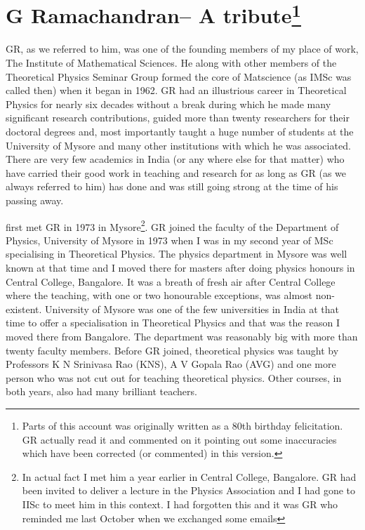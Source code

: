 
\renewcommand{\thefootnote}{\arabic{footnote}}

\chapter[G Ramachandran– A tribute]{G Ramachandran– A tribute\footnote{Parts of this account was originally written as a 80th birthday felicitation. GR actually read it and commented on it pointing out some inaccuracies which have been corrected (or commented) in this version.}}\label{chap14}




GR, as we referred to him, was one of the founding members of my place of work, The Institute of Mathematical Sciences. He along with other members of the Theoretical Physics Seminar Group formed the core of Matscience (as IMSc was called then) when it began in 1962. GR had an illustrious career in Theoretical Physics for nearly six decades without a break during which he made many significant research contributions, guided more than twenty researchers for their doctoral degrees and, most importantly taught a huge number of students at the University of Mysore and many other institutions with which he was associated. There are very few academics in India (or any where else for that matter) who have carried their good work in teaching and research for as long as GR (as we always referred to him) has done and was still going strong at the time of his passing away.

first met GR in 1973 in Mysore\footnote{In actual fact I met him a year earlier in Central College, Bangalore. GR had been invited to deliver a lecture in the Physics Association and I had gone to IISc to meet him in this context. I had forgotten this and it was GR who reminded me last October when we exchanged some emails}. GR joined the faculty of the Department of Physics, University of Mysore in 1973 when I was in my second year of MSc specialising in Theoretical Physics. The physics department in Mysore was well known at that time and I moved there for masters after doing physics honours in Central College, Bangalore. It was a breath of fresh air after Central College where the teaching, with one or two honourable exceptions, was almost non-existent. University of Mysore was one of the few universities in India at that time to offer a specialisation in Theoretical Physics and that was the reason I moved there from Bangalore. The department was reasonably big with more than twenty faculty members. Before GR joined, theoretical physics was taught by Professors K N Srinivasa Rao (KNS), A V Gopala Rao (AVG) and one more person who was not cut out for teaching theoretical physics. Other courses, in both years, also had many brilliant teachers.

